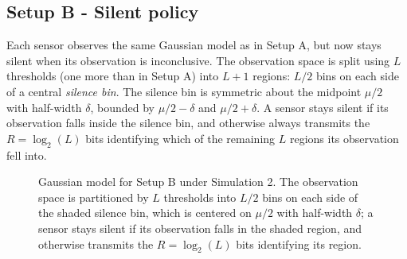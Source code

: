 \documentclass[11pt]{article}
\begin{document}
\subsection*{Setup B - Silent policy}
Each sensor observes the same Gaussian model as in Setup A, but now stays silent when its observation is inconclusive. The observation space is split using $L$ thresholds (one more than in Setup A) into $L+1$ regions: $L/2$ bins on each side of a central \emph{silence bin}. The silence bin is symmetric about the midpoint $\mu/2$ with half-width $\delta$, bounded by $\mu/2-\delta$ and $\mu/2+\delta$. A sensor stays silent if its observation falls inside the silence bin, and otherwise always transmits the $R=\log_2(L)$ bits identifying which of the remaining $L$ regions its observation fell into.

\begin{figure}[h!]
    \centering
    \caption{Gaussian model for Setup B under Simulation 2. The observation space is partitioned by $L$ thresholds into $L/2$ bins on each side of the shaded silence bin, which is centered on $\mu/2$ with half-width $\delta$; a sensor stays silent if its observation falls in the shaded region, and otherwise transmits the $R=\log_2(L)$ bits identifying its region.}
\end{figure}
\end{document}
